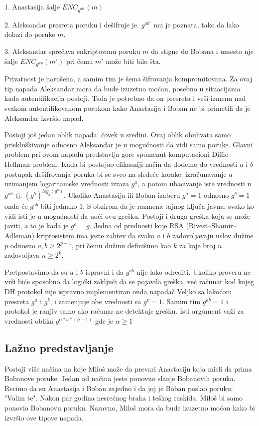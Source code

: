 \documentclass[a4paper]{article}
\begin{document}
1. Anastasija šalje $ENC_{g^{ab'}}(m)$

2. Aleksandar presreta poruku i dešifruje je. $g^{ab'}$ mu je poznata, tako da lako dolazi do poruke $m$.

3. Aleksandar sprečava enkriptovanu poruku $m$ da stigne do Bobana i umesto nje šalje $ENC_{g^{a'b}}(m')$ pri čemu $m'$ može biti bilo šta. \cite{dhpaper}

Privatnost je narušena, a samim tim je šema šifrovanja kompromitovana. Za ovaj tip napada Aleksandar mora da bude izuzetno moćan, posebno u situacijama kada autentifikacija postoji. Tada je potrebno da on presreta i vrši izmenu nad svakom autentifikovanom porukom kako Anastasija i Boban ne bi primetili da je Aleksandar izvršio napad.

Postoji još jedan oblik napada: čovek u sredini. Ovaj oblik obuhvata samo priskluškivanje odnosno Aleksandar je u mogućnosti da vidi samo poruke. Glavni problem pri ovom napadu predstavlja gore spomenut komputacioni Diffie-Hellman problem. Kada bi postojao efikasniji način da dođemo do vrednosti $a$ i $b$ postupak dešifrovanja poruka bi se sveo na sledeće korake: izračunavanje $a$ uzimanjem logaritamske vrednosti izraza $g^{a}$, a potom ubacivanje iste vrednosti u $g^{ab}$ tj. $(g^{b})^{log_g(g^{a})}$. \cite{dlproblem}
Ukoliko Anastasija ili Boban izaberu $g^{a}=1$ odnosno $g^{b}=1$ onda će $g^{ab}$ biti jednako 1. S obzirom da je razmena tajnog ključa javna, svako ko vidi isti je u mogućnosti da uoči ovu grešku. Postoji i druga greška koja se može javiti, a to je kada je $g^{a}=g$. Jedna od prednosti koje RSA (Rivest–Shamir–Adleman) kriptosistem ima jeste zahtev da svako $a$ i $b$ zadovoljavaju uslov dužine $p$ odnosno $a,b\geq2^{p-1}$, pri čemu dužinu definišimo kao $k$ za koje broj $n$ zadovoljava $n\geq2^{k}$. 

Pretpostavimo da su $a$ i $b$ ispravni i da $g^{ab}$ nije lako odrediti. Ukoliko proveru ne vrši biće sposobno da logički zaključi da se pojavila greška, već računar kod kojeg DH protokol nije ispravno implementiran onda napadač Veljko sa lakoćom presreta $g^{a}$ i $g^{b}$, i zamenjuje obe vrednosti sa $g^{v}=1$. Samim tim $g^{ab}=1$ i protokol je ranjiv samo ako računar ne detektuje grešku. Isti argument važi za vrednosti oblika $g^{\alpha*a*(p-1)}$ gde je $\alpha\geq1$
\subsection{Lažno predstavljanje}
Postoji više načina na koje Miloš može da prevari Anastasiju koja misli da prima Bobanove poruke. Jedan od načina jeste ponovno slanje Bobanovih poruka. Recimo da su Anastasija i Boban zajedno i da joj je Boban poslao poruku: "Volim te". Nakon par godina nesrećnog braka i teškog raskida, Miloš 
 bi samo ponovio Bobanovu poruku. Naravno, Miloš mora da bude izuzetno moćan kako bi izvršio ove tipove napada.
\end{document}
